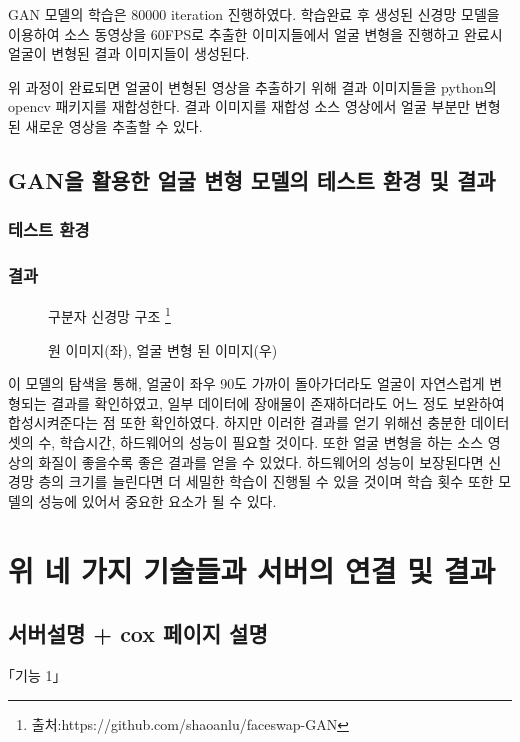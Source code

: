 \begin{enumerate}
    GAN 모델의 학습은 80000 iteration 진행하였다. 학습완료 후 생성된 신경망 모델을 이용하여 소스 동영상을 60FPS로 추출한 이미지들에서 얼굴 변형을 진행하고 완료시 얼굴이 변형된 결과 이미지들이 생성된다.

    위 과정이 완료되면 얼굴이 변형된 영상을 추출하기 위해 결과 이미지들을 python의 opencv 패키지를 재합성한다. 결과 이미지를 재합성 소스 영상에서 얼굴 부분만 변형된 새로운 영상을 추출할 수 있다.

    \section{ GAN을 활용한 얼굴 변형 모델의 테스트 환경 및 결과}

    \subsection{테스트 환경}
    \spec
    \subsection{결과}

    \begin{figure}[h!]
    \centering
    \caption{구분자 신경망 구조 \protect\footnote{출처:https://github.com/shaoanlu/faceswap-GAN}}
    \end{figure}

    \begin{figure}[h!]
    \centering
    \caption{원 이미지(좌), 얼굴 변형 된 이미지(우)}
    \end{figure}


    이 모델의 탐색을 통해, 얼굴이 좌우 90도 가까이 돌아가더라도 얼굴이 자연스럽게 변형되는 결과를 확인하였고, 일부 데이터에 장애물이 존재하더라도 어느 정도 보완하여 합성시켜준다는 점 또한 확인하였다. 하지만 이러한 결과를 얻기 위해선 충분한 데이터 셋의 수, 학습시간, 하드웨어의 성능이 필요할 것이다. 또한 얼굴 변형을 하는 소스 영상의 화질이 좋을수록 좋은 결과를 얻을 수 있었다. 하드웨어의 성능이 보장된다면 신경망 층의 크기를 늘린다면 더 세밀한 학습이 진행될 수 있을 것이며 학습 횟수 또한 모델의 성능에 있어서 중요한 요소가 될 수 있다.

    \chapter{ 위 네 가지 기술들과 서버의 연결 및 결과  }

    \section{ 서버설명 + cox 페이지 설명}

    \begin{figure}[h!]
    \centering
    \end{figure}

    \begin{figure}[h!]
    \centering
    \end{figure}
\end{enumerate}
｢기능 1｣

